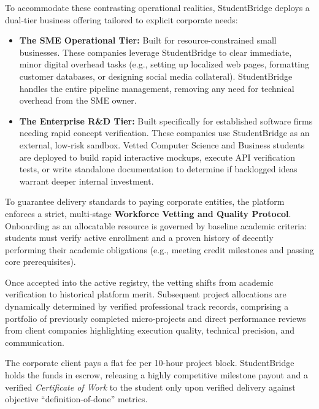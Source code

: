 \documentclass[12pt,a4paper]{article}
\begin{document}
To accommodate these contrasting operational realities, StudentBridge deploys a dual-tier business offering tailored to explicit corporate needs:

\begin{itemize}
    \item \textbf{The SME Operational Tier:} Built for resource-constrained small businesses. These companies leverage StudentBridge to clear immediate, minor digital overhead tasks (e.g., setting up localized web pages, formatting customer databases, or designing social media collateral). StudentBridge handles the entire pipeline management, removing any need for technical overhead from the SME owner.
    \item \textbf{The Enterprise R\&D Tier:} Built specifically for established software firms needing rapid concept verification. These companies use StudentBridge as an external, low-risk sandbox. Vetted Computer Science and Business students are deployed to build rapid interactive mockups, execute API verification tests, or write standalone documentation to determine if backlogged ideas warrant deeper internal investment.
\end{itemize}

To guarantee delivery standards to paying corporate entities, the platform enforces a strict, multi-stage \textbf{Workforce Vetting and Quality Protocol}. Onboarding as an allocatable resource is governed by baseline academic criteria: students must verify active enrollment and a proven history of decently performing their academic obligations (e.g., meeting credit milestones and passing core prerequisites).

Once accepted into the active registry, the vetting shifts from academic verification to historical platform merit. Subsequent project allocations are dynamically determined by verified professional track records, comprising a portfolio of previously completed micro-projects and direct performance reviews from client companies highlighting execution quality, technical precision, and communication.

The corporate client pays a flat fee per 10-hour project block. StudentBridge holds the funds in escrow, releasing a highly competitive milestone payout and a verified \emph{Certificate of Work} to the student only upon verified delivery against objective ``definition-of-done'' metrics.
\end{document}
